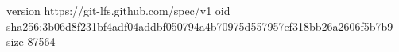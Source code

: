 version https://git-lfs.github.com/spec/v1
oid sha256:3b06d8f231bf4adf04addbf050794a4b70975d557957ef318bb26a2606f5b7b9
size 87564
